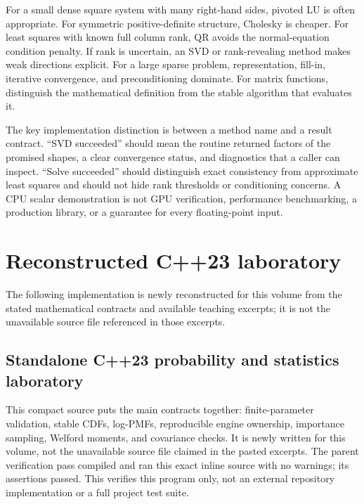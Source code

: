 For a small dense square system with many right-hand sides, pivoted LU is often appropriate. For symmetric positive-definite structure, Cholesky is cheaper. For least squares with known full column rank, QR avoids the normal-equation condition penalty. If rank is uncertain, an SVD or rank-revealing method makes weak directions explicit. For a large sparse problem, representation, fill-in, iterative convergence, and preconditioning dominate. For matrix functions, distinguish the mathematical definition from the stable algorithm that evaluates it.

The key implementation distinction is between a method name and a result contract. ``SVD succeeded'' should mean the routine returned factors of the promised shapes, a clear convergence status, and diagnostics that a caller can inspect. ``Solve succeeded'' should distinguish exact consistency from approximate least squares and should not hide rank thresholds or conditioning concerns. A CPU scalar demonstration is not GPU verification, performance benchmarking, a production library, or a guarantee for every floating-point input.

\section{Reconstructed C++23 laboratory}\label{02-foundations-ii-ch038-reconstructed-c23-laboratory}

\hypertarget{02-foundations-ii-ch038-reconstructed-c23-laboratory}{}

The following implementation is newly reconstructed for this volume from the stated mathematical contracts and available teaching excerpts; it is not the unavailable source file referenced in those excerpts.

\subsection{Standalone C++23 probability and statistics laboratory}\label{02-foundations-ii-ch038-standalone-c23-probability-and-statistics-laboratory}

\hypertarget{02-foundations-ii-ch038-standalone-c23-probability-and-statistics-laboratory}{}

This compact source puts the main contracts together: finite-parameter validation, stable CDFs, log-PMFs, reproducible engine ownership, importance sampling, Welford moments, and covariance checks. It is newly written for this volume, not the unavailable source file claimed in the pasted excerpts. The parent verification pass compiled and ran this exact inline source with no warnings; its assertions passed. This verifies this program only, not an external repository implementation or a full project test suite.

